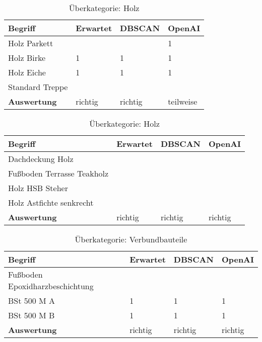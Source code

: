 \begin{table}[h]
	
	\centering
	\begin{tabular}{|l|l|l|l|}
		\hline
		\textbf{Begriff} & \textbf{Erwartet} & \textbf{DBSCAN} & \textbf{OpenAI}\\ \hline
		 Holz Parkett & ~ & ~ & 1 \\ \hline
		Holz Birke & 1 & 1 & 1 \\ \hline
		Holz Eiche & 1 & 1 & 1 \\ \hline
		Standard Treppe & ~ & ~ & ~ \\ \hline
		\textbf{Auswertung} & richtig & richtig & teilweise \\ \hline
	\end{tabular}
	\caption{Überkategorie: Holz}
	\label{t:evaluation-example19}
\end{table}

\begin{table}[h]
	
	\centering
	\begin{tabular}{|l|l|l|l|}
		\hline
		\textbf{Begriff} & \textbf{Erwartet} & \textbf{DBSCAN} & \textbf{OpenAI}\\ \hline
		  Dachdeckung Holz & ~ & ~ & ~ \\ \hline
		Fußboden Terrasse Teakholz & ~ & ~ & ~ \\ \hline
		Holz HSB Steher & ~ & ~ & ~ \\ \hline
		Holz Astfichte senkrecht & ~ & ~ & ~ \\ \hline
		\textbf{Auswertung} & richtig & richtig & richtig \\ \hline
	\end{tabular}
	\caption{Überkategorie: Holz}
	\label{t:evaluation-example20}
\end{table}

\begin{table}[h]
	
	\centering
	\begin{tabular}{|l|l|l|l|}
		\hline
		\textbf{Begriff} & \textbf{Erwartet} & \textbf{DBSCAN} & \textbf{OpenAI}\\ \hline
		 Fußboden Epoxidharzbeschichtung & ~ & ~ & ~ \\ \hline
		BSt 500 M A & 1 & 1 & 1 \\ \hline
		BSt 500 M B & 1 & 1 & 1 \\ \hline
		\textbf{Auswertung} & richtig & richtig & richtig\\ \hline
	\end{tabular}
	\caption{Überkategorie: Verbundbauteile}
	\label{t:evaluation-example21}
\end{table}

